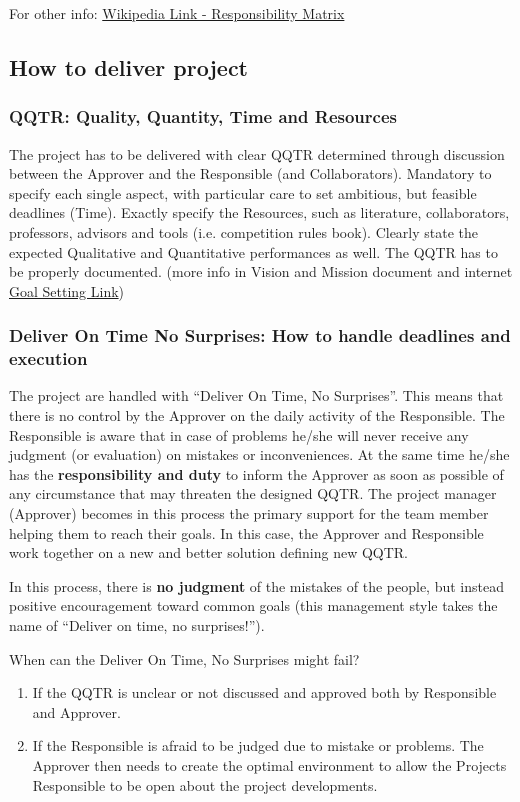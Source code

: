 \documentclass[graybox]{svmult}
\begin{document}
For other info: \href{https://en.wikipedia.org/wiki/Responsibility_assignment_matrix}{Wikipedia Link -  Responsibility Matrix}


\subsection{How to deliver project}
\subsubsection{QQTR: Quality, Quantity, Time and Resources}
The project has to be delivered with clear QQTR determined through discussion between the Approver and the Responsible (and Collaborators).
Mandatory to specify each single aspect, with particular care to set ambitious, but feasible deadlines (Time). Exactly specify the Resources, such as literature, collaborators, professors, advisors and tools (i.e. competition rules book). Clearly state the expected Qualitative and Quantitative performances as well.
The QQTR has to be properly documented.
(more info in Vision and Mission document and internet \href{https://mikecardus.com/shared-language-of-goal-setting-will-ensure-goals-are-understood/}{Goal Setting Link})

\subsubsection{Deliver On Time No Surprises: How to handle deadlines and execution}
The project are handled with “Deliver On Time, No Surprises”. This means that there is no control by the Approver on the daily activity of the Responsible. The Responsible is aware that in case of problems he/she will never receive any judgment (or evaluation) on mistakes or inconveniences. At the same time he/she has the \textbf{responsibility and duty} to inform the Approver as soon as possible of any circumstance that may threaten the designed QQTR. The project manager (Approver) becomes in this process the primary support for the team member helping them to reach their goals.
In this case, the Approver and Responsible work together on a new and better solution defining new QQTR.

In this process, there is \textbf{no judgment} of the mistakes of the people, but instead positive encouragement toward common goals (this management style takes the name of “Deliver on time, no surprises!”).

\begin{svgraybox}
When can the Deliver On Time, No Surprises might fail?
\begin{enumerate}
\item If the QQTR is unclear or not discussed and approved both by Responsible and Approver.
\item If the Responsible is afraid to be judged due to mistake or problems. The Approver then needs to create the optimal environment to allow the Projects Responsible to be open about the project developments.
\end{enumerate}
\end{svgraybox}
\end{document}
